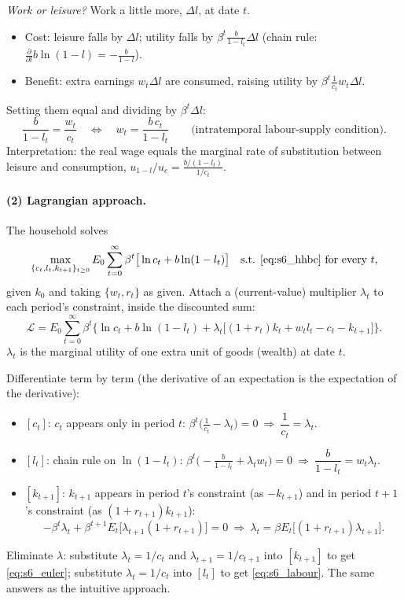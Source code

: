 \emph{Work or leisure?} Work a little more, $\Delta l$, at date $t$.
\begin{itemize}
  \item Cost: leisure falls by $\Delta l$; utility falls by $\beta^t\frac{b}{1-l_t}\Delta l$ (chain rule: $\frac{\partial}{\partial l}b\ln(1-l)=-\frac{b}{1-l}$).
  \item Benefit: extra earnings $w_t\Delta l$ are consumed, raising utility by $\beta^t\frac{1}{c_t}w_t\Delta l$.
\end{itemize}
Setting them equal and dividing by $\beta^t\Delta l$:
\begin{equation}\label{eq:s6_labour}
\frac{b}{1-l_t}=\frac{w_t}{c_t}\quad\Longleftrightarrow\quad w_t=\frac{b\,c_t}{1-l_t}\qquad\text{(intratemporal labour-supply condition).}
\end{equation}
Interpretation: the real wage equals the marginal rate of substitution between leisure and consumption, $u_{1-l}/u_c=\frac{b/(1-l_t)}{1/c_t}$.

\paragraph{(2) Lagrangian approach.} The household solves
\[
\max_{\{c_t,l_t,k_{t+1}\}_{t\ge0}}E_0\sum_{t=0}^\infty\beta^t\big[\ln c_t+b\ln(1-l_t)\big]\quad\text{s.t. \eqref{eq:s6_hhbc} for every }t,
\]
given $k_0$ and taking $\{w_t,r_t\}$ as given. Attach a (current-value) multiplier $\lambda_t$ to each period's constraint, inside the discounted sum:
\[
\mathcal L=E_0\sum_{t=0}^\infty\beta^t\Big\{\ln c_t+b\ln(1-l_t)+\lambda_t\big[(1+r_t)k_t+w_tl_t-c_t-k_{t+1}\big]\Big\}.
\]
$\lambda_t$ is the marginal utility of one extra unit of goods (wealth) at date $t$.

Differentiate term by term (the derivative of an expectation is the expectation of the derivative):
\begin{itemize}
  \item $[c_t]$: $c_t$ appears only in period $t$: $\beta^t\big(\frac1{c_t}-\lambda_t\big)=0\ \Rightarrow\ \dfrac1{c_t}=\lambda_t$.
  \item $[l_t]$: chain rule on $\ln(1-l_t)$: $\beta^t\big(-\frac{b}{1-l_t}+\lambda_tw_t\big)=0\ \Rightarrow\ \dfrac{b}{1-l_t}=w_t\lambda_t$.
  \item $[k_{t+1}]$: $k_{t+1}$ appears in period $t$'s constraint (as $-k_{t+1}$) and in period $t+1$'s constraint (as $(1+r_{t+1})k_{t+1}$):
  \[
  -\beta^t\lambda_t+\beta^{t+1}E_t\big[\lambda_{t+1}(1+r_{t+1})\big]=0\ \Rightarrow\ \lambda_t=\beta E_t\big[(1+r_{t+1})\lambda_{t+1}\big].
  \]
\end{itemize}
Eliminate $\lambda$: substitute $\lambda_t=1/c_t$ and $\lambda_{t+1}=1/c_{t+1}$ into $[k_{t+1}]$ to get \eqref{eq:s6_euler}; substitute $\lambda_t=1/c_t$ into $[l_t]$ to get \eqref{eq:s6_labour}. The same answers as the intuitive approach.

